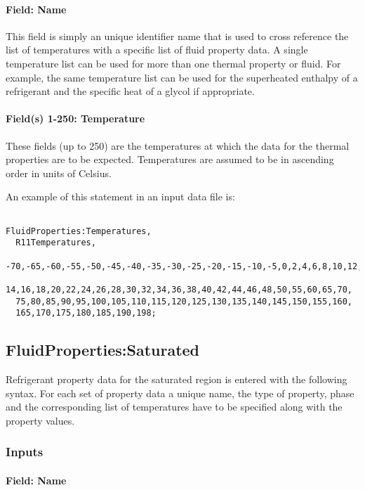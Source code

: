 \paragraph{Field: Name}\label{field-name-1-017}

This field is simply an unique identifier name that is used to cross reference the list of temperatures with a specific list of fluid property data. A single temperature list can be used for more than one thermal property or fluid. For example, the same temperature list can be used for the superheated enthalpy of a refrigerant and the specific heat of a glycol if appropriate.

\paragraph{Field(s) 1-250: Temperature}\label{fields-1-250-temperature}

These fields (up to 250) are the temperatures at which the data for the thermal properties are to be expected. Temperatures are assumed to be in ascending order in units of Celsius.

An example of this statement in an input data file is:

\begin{lstlisting}

FluidProperties:Temperatures,
  R11Temperatures,
  -70,-65,-60,-55,-50,-45,-40,-35,-30,-25,-20,-15,-10,-5,0,2,4,6,8,10,12,
  14,16,18,20,22,24,26,28,30,32,34,36,38,40,42,44,46,48,50,55,60,65,70,
  75,80,85,90,95,100,105,110,115,120,125,130,135,140,145,150,155,160,
  165,170,175,180,185,190,198;
\end{lstlisting}

\subsection{FluidProperties:Saturated}\label{fluidpropertiessaturated}

Refrigerant property data for the saturated region is entered with the following syntax. For each set of property data a unique name, the type of property, phase and the corresponding list of temperatures have to be specified along with the property values.

\subsubsection{Inputs}\label{inputs-3-015}

\paragraph{Field: Name}\label{field-name-2-016}

